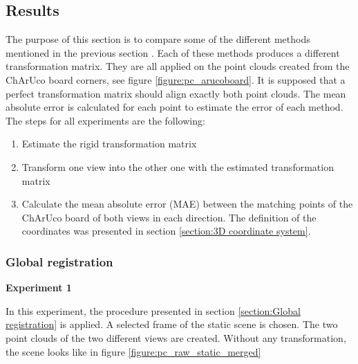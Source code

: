\subsection{Results}
The purpose of this section is to compare some of the different methods mentioned in the previous section . Each of these methods produces a different transformation matrix. They are all applied on the point clouds created from the ChArUco board corners, see figure \ref{figure:pc_arucoboard}. It is supposed that a perfect transformation matrix should align exactly both point clouds. The mean absolute error is calculated for each point to estimate the error of each method. The steps for all experiments are the following:

\begin{enumerate}
    \item Estimate the rigid transformation matrix
    \item Transform one view into the other one with the estimated transformation matrix
    \item Calculate the mean absolute error (MAE) between the matching points of the ChArUco board of both views in each direction. The definition of the coordinates was presented in section \ref{section:3D coordinate system}.
\end{enumerate}

\subsubsection{Global registration}
\label{section:Global registration result}
\textbf{Experiment 1}

In this experiment, the procedure presented in section \ref{section:Global registration} is applied. A selected frame of the static scene is chosen. The two point clouds of the two different views are created. Without any transformation, the scene looks like in figure \ref{figure:pc_raw_static_merged}

